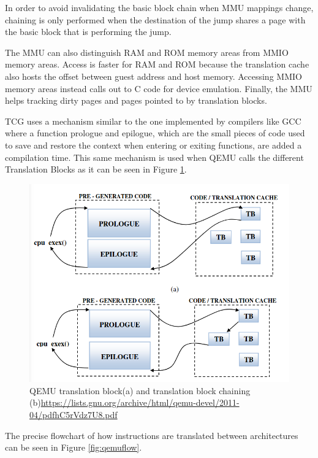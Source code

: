\begin{itemize}
    In order to avoid invalidating the basic block chain when MMU mappings change, chaining is only performed when the destination of the jump shares a page with the basic block that is performing the jump.

    The MMU can also distinguish RAM and ROM memory areas from MMIO memory areas. Access is faster for RAM and ROM because the translation cache also hosts the offset between guest address and host memory. Accessing MMIO memory areas instead calls out to C code for device emulation. Finally, the MMU helps tracking dirty pages and pages pointed to by translation blocks.

\end{itemize}

TCG uses a mechanism similar to the one implemented by compilers like GCC where a function prologue and epilogue, which are the small pieces of code used to save and restore the context when entering or exiting functions, are added a compilation time. This same mechanism is used when QEMU calls the different Translation Blocks as it can be seen in Figure \ref{fig:qemutbc}.  

\begin{figure}[htp]
\centering
\includegraphics[width=\linewidth]{images/qemutbc.png}
\caption{QEMU translation block(a) and translation block chaining (b)\newline\url{https://lists.gnu.org/archive/html/qemu-devel/2011-04/pdfhC5rVdz7U8.pdf}}
\label{fig:qemutbc}
\end{figure}

The precise flowchart of how instructions are translated between architectures can be seen in Figure \ref{fig:qemuflow}.

